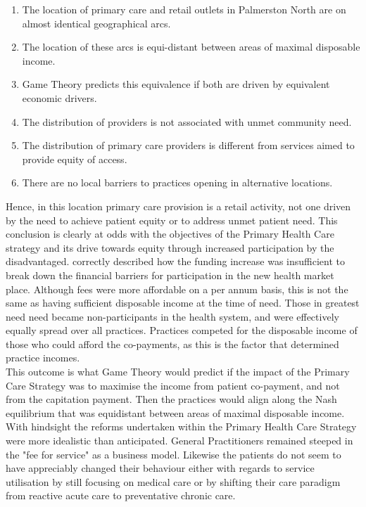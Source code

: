 \documentclass[11pt,a4paper]{article}
\begin{document}
\begin{enumerate}
\item The location of primary care and retail outlets in Palmerston North are on almost identical geographical arcs.
\item The location of these arcs is equi-distant between areas of maximal disposable income.
\item Game Theory predicts this equivalence if both are driven by equivalent economic drivers.
\item The distribution of providers is not associated with unmet community need.
\item The distribution of primary care providers is different from services aimed to provide equity of access.
\item There are no local barriers to practices opening in alternative locations.
\end{enumerate}

Hence, in this location primary care provision is a retail activity, not one driven by the need to achieve patient equity or to address unmet patient need. This conclusion is clearly at odds with the objectives of the Primary Health Care strategy and its drive towards equity through increased participation by the disadvantaged. \citet{cumming2008reforming} correctly described how the funding increase was insufficient to break down the financial barriers for participation in the new health market place. Although fees were more affordable on a per annum basis, this is not the same as having sufficient disposable income at the time of need. Those in greatest need need became non-participants in the health system, and were effectively equally spread over all practices. Practices competed for the disposable income of those who could afford the co-payments, as this is the factor that determined practice incomes.\\

This outcome is what Game Theory would predict if the impact of the Primary Care Strategy was to maximise the income from patient co-payment, and not from the capitation payment. Then the practices would align along the Nash equilibrium that was equidistant between areas of maximal disposable income. With hindsight the reforms undertaken within the Primary Health Care Strategy were more idealistic than anticipated. General Practitioners remained steeped in the "fee for service" as a business model. Likewise the patients do not seem to have appreciably changed their behaviour either with regards to service utilisation by still focusing on medical care or by shifting their care paradigm from reactive acute care to preventative chronic care. \\
\end{document}
